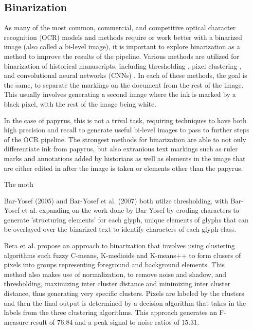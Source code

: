 \documentclass[12pt,a4paper,final]{article}
\begin{document}
\subsection{Binarization}
\todo{}
As many of the most common, commercial, and competitive optical character recognition (OCR) models and methods require or work better with a binarized image \cite{Gupta, Smith, Bar-Yosef2005, Bar-Yosef2007} (also called a bi-level image), it is important to explore binarization as a method to improve the results of the pipeline.
Various methods are utilized for binarization of historical manuscripts, including thresholding \cite{Bar-Yosef2005, Bar-Yosef2007}, pixel clustering \cite{Bera}, and convolutional neural networks (CNNs) \cite{Dhali2019, Dhali2020, Xiong}. In each of these methods, the goal is the same, to separate the markings on the document from the rest of the image. This usually involves generating a second image where the ink is marked by a black pixel, with the rest of the image being white.

In the case of papyrus, this is not a trival task, requiring techniques to have both high precision and recall to generate useful bi-level images to pass to further steps of the OCR pipeline. The strongest methods for binarization are able to not only differentiate ink from papyrus, but also extranious text markings such as ruler marks and annotations added by historians as well as elements in the image that are either edited in after the image is taken or elements other than the papyrus.

The moth

Bar-Yosef (2005)\cite{Bar-Yosef2005} and Bar-Yosef et al. (2007)\cite{Bar-Yosef2005} both utilze thresholding, with Bar-Yosef et al. expanding on the work done by Bar-Yosef by eroding characters to generate 'structuring elements' for each glyph, unique elements of glyphs that can be overlayed over the binarized text to identify characters of each glyph class.

Bera et al.\cite{Bera} propose an approach to binarization that involves using clustering algorithms such fuzzy C-means, K-medioids and K-means++ to form clusers of pixels into groups representing foreground and background elements. This method also makes use of normalization, to remove noise and shadow, and thresholding, maximizing inter cluster distance and minimizing inter cluster distance, thus generating very specific clusters. Pixels are labeled by the clusters and then the final output is determined by a decision algorithm that takes in the labels from the three clustering algorithms. This approach generates an F-measure result of $76.84$ and a peak signal to noise ratios of $15.31$.
\end{document}
